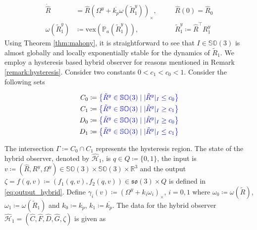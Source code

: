 \documentclass{article}
\newcommand{\SOthree}{\mathbb{SO}(3)}
\newcommand{\sothree}{\mathfrak{so}(3)}
\newcommand{\R}[1]{\mathbb{R}^{#1}}
\newcommand{\Omegay}{\Omega^y}
\newcommand{\vex}[1]{\text{vex}\left(#1\right)}
\newcommand{\textblue}[1]{\textcolor{blue}{#1}}
\newcommand{\Rtilde}{\tilde{R}}
\newcommand{\normSOthree}[1]{{{\vert}#1 {\vert}_I}}
\begin{document}
\begin{subequations}\label{eq:unstable_observer}
\begin{alignat}{3}
    \dot{\hat{R}} &= \hat{R}\left( \Omegay + \overline{k_p}\omega(\Rtilde_1^y)\right)_\times, \quad &&\hat{R}(0) = \hat{R}_0 \\
    \omega(\Rtilde_1^y) &\coloneqq \vex{\mathbb{P}_a({\Rtilde_1^y})}, \quad &&{\Rtilde_1^y \coloneqq \hat{R}^\top R^y_1}
\end{alignat}
\end{subequations}
Using Theorem \ref{thm:mahony}, it is straightforward to see that  $I\in\SOthree$ is almost globally and locally exponentially stable for the dynamics of $\Rtilde_1$.  We employ a hysteresis based hybrid observer for reasons mentioned in Remark \ref{remark:hysteresis}. Consider two constants $ 0 < c_1 < c_0 < 1$. Consider the following sets

\begin{subequations}
\begin{align}
    C_0 &\coloneqq \textblue{\left\{\Rtilde^y \in \SOthree \mid \normSOthree{\Rtilde^y} \leq c_0 \right\}}\\
    C_1 &\coloneqq \textblue{\left\{\Rtilde^y \in \SOthree \mid \normSOthree{\Rtilde^y} \geq c_1 \right\}}\\
    D_0 &\coloneqq \textblue{\left\{\Rtilde^y \in \SOthree \mid \normSOthree{\Rtilde^y} \geq c_0 \right\}}\\
    D_1 &\coloneqq \textblue{\left\{\Rtilde^y \in \SOthree \mid \normSOthree{\Rtilde^y} \leq c_1 \right\}}
\end{align}
\end{subequations}

 The intersection $\Gamma \coloneqq C_0\cap C_1$ represents the hysteresis region. The state of the hybrid observer, denoted by $\hat{\mathcal{H}}_1$, is $q\in Q\coloneqq \{0, 1\}$, the input is $v \coloneqq (\hat{R}, R^y, \Omegay)\in \SOthree\times \SOthree \times \R{3}$ and the output $\zeta=f(q,v)\coloneqq (f_1(q,v), f_2(q,v))\in\sothree\times Q$ is defined in \eqref{eq:output_hybrid}. Define $\gamma_i(v) \coloneqq (\Omegay + k_i\omega_i)_\times$, $i=0,1$ where $\omega_0 \coloneqq \omega(\Rtilde)$, $\omega_1 \coloneqq \omega(\Rtilde_1)$ and $k_0 \coloneqq k_p$, $k_1\coloneqq \overline{k_p}$. The data for the hybrid observer $\hat{\mathcal{H}}_1 = ({\hat{C}, \hat{F}, \hat{D}, \hat{G}, \zeta})$ is given as 
\end{document}
